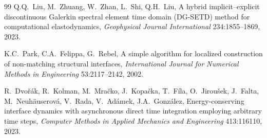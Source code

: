 \documentclass[11pt]{article}
\begin{document}
\begin{thebibliography}{99}
Q.Q.~Liu, M.~Zhuang, W.~Zhan, L.~Shi, Q.H.~Liu,
A hybrid implicit--explicit discontinuous Galerkin spectral element time
domain (DG-SETD) method for computational elastodynamics,
\emph{Geophysical Journal International} 234:1855--1869, 2023.

K.C.~Park, C.A.~Felippa, G.~Rebel,
A simple algorithm for localized construction of non-matching structural
interfaces,
\emph{International Journal for Numerical Methods in Engineering}
53:2117--2142, 2002.

R.~Dvo\v{r}\'ak, R.~Kolman, M.~Mra\v{c}ko, J.~Kopa\v{c}ka, T.~F\'ila,
O.~Jirou\v{s}ek, J.~Falta, M.~Neuh\"auserov\'a, V.~Rada, V.~Ad\'amek,
J.A.~Gonz\'alez,
Energy-conserving interface dynamics with asynchronous direct time
integration employing arbitrary time steps,
\emph{Computer Methods in Applied Mechanics and Engineering} 413:116110,
2023.

\end{thebibliography}
\end{document}
